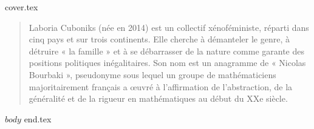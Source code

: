 \documentclass[12pt]{book}
\begin{document}


{cover.tex}
\clearpage
\begin{quote}
\singlespacing
{\footnotesize Laboria Cuboniks (née en 2014) est un collectif xénoféministe, réparti dans cinq pays et sur trois continents. Elle cherche à démanteler le genre, à détruire « la famille » et à se débarrasser de la nature comme garante des positions politiques inégalitaires. Son nom est un anagramme de « Nicolas Bourbaki », pseudonyme sous lequel un groupe de mathématiciens majoritairement français a œuvré à l'affirmation de l'abstraction, de la généralité et de la rigueur en mathématiques au début du XXe siècle. }
\clearpage
\end{quote}

\onehalfspacing %

$body$
{end.tex}

\end{document}
